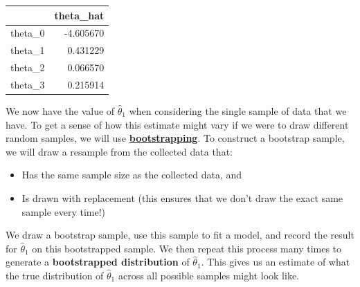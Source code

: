 \documentclass[
  letterpaper,
  DIV=11,
  numbers=noendperiod]{scrreprt}
\providecommand{\tightlist}{%
  \setlength{\itemsep}{0pt}\setlength{\parskip}{0pt}}\usepackage{longtable,booktabs,array}
\begin{document}
\begin{tabular}{lr}
\toprule
{} &  theta\_hat \\
\midrule
theta\_0 &  -4.605670 \\
theta\_1 &   0.431229 \\
theta\_2 &   0.066570 \\
theta\_3 &   0.215914 \\
\bottomrule
\end{tabular}

We now have the value of \(\hat{\theta}_1\) when considering the single
sample of data that we have. To get a sense of how this estimate might
vary if we were to draw different random samples, we will use
\textbf{\href{https://inferentialthinking.com/chapters/13/2/Bootstrap.html?}{bootstrapping}}.
To construct a bootstrap sample, we will draw a resample from the
collected data that:

\begin{itemize}
\tightlist
\item
  Has the same sample size as the collected data, and
\item
  Is drawn with replacement (this ensures that we don't draw the exact
  same sample every time!)
\end{itemize}

We draw a bootstrap sample, use this sample to fit a model, and record
the result for \(\hat{\theta}_1\) on this bootstrapped sample. We then
repeat this process many times to generate a \textbf{bootstrapped
distribution} of \(\hat{\theta}_1\). This gives us an estimate of what
the true distribution of \(\hat{\theta}_1\) across all possible samples
might look like.
\end{document}
